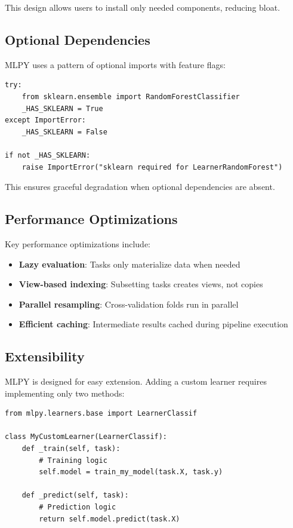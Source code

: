 \documentclass[twoside,11pt]{article}
\begin{document}
This design allows users to install only needed components, reducing bloat.

\subsection{Optional Dependencies}

MLPY uses a pattern of optional imports with feature flags:

\begin{lstlisting}
try:
    from sklearn.ensemble import RandomForestClassifier
    _HAS_SKLEARN = True
except ImportError:
    _HAS_SKLEARN = False

if not _HAS_SKLEARN:
    raise ImportError("sklearn required for LearnerRandomForest")
\end{lstlisting}

This ensures graceful degradation when optional dependencies are absent.

\subsection{Performance Optimizations}

Key performance optimizations include:
\begin{itemize}
  \item \textbf{Lazy evaluation}: Tasks only materialize data when needed
  \item \textbf{View-based indexing}: Subsetting tasks creates views, not copies
  \item \textbf{Parallel resampling}: Cross-validation folds run in parallel
  \item \textbf{Efficient caching}: Intermediate results cached during pipeline execution
\end{itemize}

\subsection{Extensibility}

MLPY is designed for easy extension. Adding a custom learner requires
implementing only two methods:

\begin{lstlisting}
from mlpy.learners.base import LearnerClassif

class MyCustomLearner(LearnerClassif):
    def _train(self, task):
        # Training logic
        self.model = train_my_model(task.X, task.y)

    def _predict(self, task):
        # Prediction logic
        return self.model.predict(task.X)
\end{lstlisting}
\end{document}

